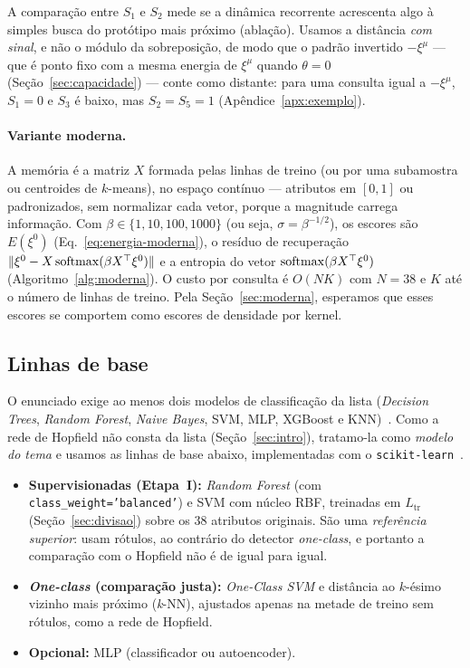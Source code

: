 A comparação entre $S_1$ e $S_2$ mede se a dinâmica recorrente acrescenta algo à simples busca do protótipo
mais próximo (ablação). Usamos a distância \emph{com sinal}, e não o módulo da sobreposição, de modo que o padrão
invertido $-\xi^\mu$ --- que é ponto fixo com a mesma energia de $\xi^\mu$ quando $\theta=0$ (Seção~\ref{sec:capacidade})
--- conte como distante: para uma consulta igual a $-\xi^\mu$, $S_1=0$ e $S_3$ é baixo, mas $S_2=S_5=1$
(Apêndice~\ref{apx:exemplo}).

\paragraph{Variante moderna.} A memória é a matriz $X$ formada pelas linhas de treino (ou por uma subamostra
ou centroides de $k$-means), no espaço contínuo --- atributos em $[0,1]$ ou padronizados, sem normalizar cada
vetor, porque a magnitude carrega informação. Com $\beta\in\{1,10,100,1000\}$ (ou seja, $\sigma=\beta^{-1/2}$),
os escores são $E(\xi^0)$ (Eq.~\ref{eq:energia-moderna}), o resíduo de recuperação
$\|\xi^0-X\operatorname{softmax}(\beta X^{\top}\xi^0)\|$ e a entropia do vetor $\operatorname{softmax}(\beta X^{\top}\xi^0)$
(Algoritmo~\ref{alg:moderna}). O custo por consulta é $O(NK)$ com $N=38$ e $K$ até o número de linhas de treino.
Pela Seção~\ref{sec:moderna}, esperamos que esses escores se comportem como escores de densidade por kernel.

\subsection{Linhas de base}\label{sec:baselines}
O enunciado exige ao menos dois modelos de classificação da lista (\emph{Decision Trees}, \emph{Random Forest},
\emph{Naive Bayes}, SVM, MLP, XGBoost e KNN)~\cite{enunciado}. Como a rede de Hopfield não consta da lista
(Seção~\ref{sec:intro}), tratamo-la como \emph{modelo do tema} e usamos as linhas de base abaixo, implementadas
com o \texttt{scikit-learn}~\cite{pedregosa2011}.
\begin{itemize}
  \item \textbf{Supervisionadas (Etapa~I):} \emph{Random Forest} (com \texttt{class\_weight='balanced'}) e SVM com
        núcleo RBF, treinadas em $L_{\mathrm{tr}}$ (Seção~\ref{sec:divisao}) sobre os 38 atributos originais. São uma
        \emph{referência superior}: usam rótulos, ao contrário do detector \emph{one-class}, e portanto a
        comparação com o Hopfield não é de igual para igual.
  \item \textbf{\emph{One-class} (comparação justa):} \emph{One-Class SVM} e distância ao $k$-ésimo vizinho mais
        próximo (\emph{k}-NN), ajustados apenas na metade de treino sem rótulos, como a rede de Hopfield.
  \item \textbf{Opcional:} MLP (classificador ou autoencoder).
\end{itemize}

